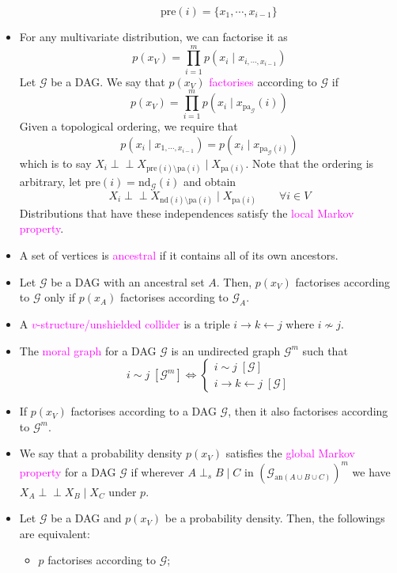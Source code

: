\documentclass[UTF8]{book}
\newcommand{\perpp}{\ensuremath{\perp\!\!\!\!\!\perp}}
\newcommand{\concept}[1]{\textcolor{magenta}{#1}}
\begin{document}
\begin{itemize}
\begin{itemize}
	$$
		\mathrm{pre}(i) = \{x_1,\cdots , x_{i-1}\}	
	$$
\end{itemize}
\item For any multivariate distribution, we can factorise it as
$$
p(x_V) = \prod_{i=1}^m p(x_i\mid x_{i,\cdots ,x_{i-1}})
$$
Let $\mathcal{G}$ be a DAG. We say that $p(x_V)$ \concept{factorises} according to $\mathcal{G}$ if
$$
p(x_V) = \prod_{i=1}^m p(x_i\mid x_{\mathrm{pa}_\mathcal{G}}(i))
$$
Given a topological ordering, we require that
$$
p(x_i\mid x_{1,\cdots ,x_{i-1}}) = p(x_i\mid x_{\mathrm{pa}_\mathcal{G}(i)})
$$
which is to say $X_i\perpp X_{\mathrm{pre}(i)\setminus \mathrm{pa}(i)}\mid X_{\mathrm{pa}(i)}$. Note that the ordering is arbitrary, let $\mathrm{pre}(i) = \mathrm{nd}_\mathcal{G}(i)$ and obtain
$$
	X_i\perpp X_{\mathrm{nd}(i)\setminus \mathrm{pa}(i)}\mid X_{\mathrm{pa}(i)} \qquad \forall i\in V
$$
Distributions that have these independences satisfy the \concept{local Markov property}.
\item A set of vertices is \concept{ancestral} if it contains all of its own ancestors.
\item Let $\mathcal{G}$ be a DAG with an ancestral set $A$. Then, $p(x_V)$ factorises according to $\mathcal{G}$ only if $p(x_A)$ factorises according to $\mathcal{G}_A$.
\item A \concept{$v$-structure/unshielded collider} is a triple $i\rightarrow k\leftarrow j$ where $i\not\sim j$.
\item The \concept{moral graph} for a DAG $\mathcal{G}$ is an undirected graph $\mathcal{G}^m$ such that 
$$
i\sim j \; [\mathcal{G}^m] \Leftrightarrow \begin{cases}
i\sim j \; [\mathcal{G}] \\
i\rightarrow k\leftarrow j \; [\mathcal{G}]
\end{cases}
$$
\item If $p(x_V)$ factorises according to a DAG $\mathcal{G}$, then it also factorises according to $\mathcal{G}^m$.
\item We say that a probability density $p(x_V)$ satisfies the \concept{global Markov property} for a DAG $\mathcal{G}$ if wherever $A\perp_s B\mid C$ in $(\mathcal{G}_{\mathrm{an}(A\cup B\cup C)})^m$ we have $X_A\perpp X_B\mid X_C$ under $p$.
\item Let $\mathcal{G}$ be a DAG and $p(x_V)$ be a probability density. Then, the followings are equivalent:
\begin{itemize}
	\item $p$ factorises according to $\mathcal{G}$;

\end{itemize}
\end{itemize}
\end{document}

